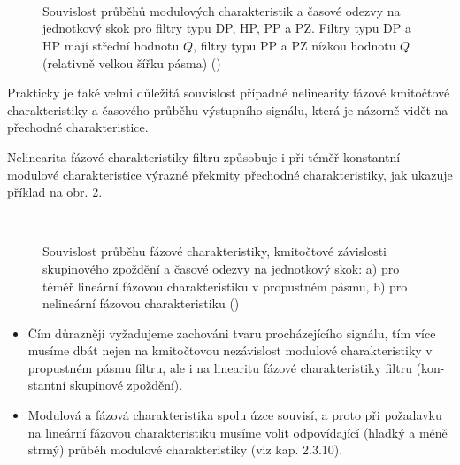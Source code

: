         \begin{figure}[ht!]
          \centering  
             \\
             \\
             \\
          \caption{Souvislost průběhů modulových charakteristik a časové odezvy na jednotkový skok
                  pro filtry typu DP, HP, PP a PZ. Filtry typu DP a HP mají střední hodnotu \(Q\),
                  filtry typu PP a PZ nízkou hodnotu \(Q\) (relativně velkou šířku pásma)
                  (\cite[s.~32]{HajekSedlacek2002})}
                  \label{aes:fig032}
        \end{figure}

        Prakticky je také velmi důležitá souvislost případné nelinearity fázové kmitočtové
        charakteristiky a časového průběhu výstupního signálu, která je názorně vidět na přechodné
        charakteristice. 
        
        Nelinearita fázové charakteristiky filtru způsobuje i při téměř konstantní modulové
        charakteristice výrazné překmity přechodné charakteristiky, jak ukazuje příklad na obr.
        \ref{aes:fig033}. 

        \begin{figure}[ht!]
          \centering  
                \\
          \caption{Souvislost průběhu fázové charakteristiky, kmitočtové závislosti skupinového
                  zpoždění a časové odezvy na jednotkový skok: a) pro téměř lineární fázovou
                  charakteristiku v propustném pásmu, b) pro nelineární fázovou charakteristiku
                  (\cite[s.~33]{HajekSedlacek2002})}
                  \label{aes:fig033}
        \end{figure}

        \begin{tcnote}
          \begin{itemize}[noitemsep]
            \item Čím důrazněji vyžadujeme zachováni tvaru procházejícího signálu, tím více musíme
                  dbát nejen na kmitočtovou nezávislost modulové charakteristiky v propustném
                  pásmu filtru, ale i na linearitu fázové charakteristiky filtru (kon- stantní
                  skupinové zpoždění). 
            \item Modulová a fázová charakteristika spolu úzce souvisí, a proto při požadavku na
                  lineární fázovou charakteristiku musíme volit odpovídající (hladký a méně strmý)
                  průběh modulové charakteristiky (viz kap. 2.3.10). 
          \end{itemize}
        \end{tcnote}

